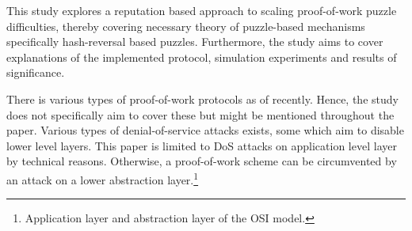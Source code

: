This study explores a reputation based approach to scaling proof-of-work puzzle difficulties, thereby covering necessary theory of puzzle-based mechanisms specifically hash-reversal based puzzles. Furthermore, the study aims to cover explanations of the implemented protocol, simulation experiments and results of significance. 

There is various types of proof-of-work protocols as of recently. Hence, the study does not specifically aim to cover these but might be mentioned throughout the paper. Various types of denial-of-service attacks exists, some which aim to disable lower level layers. This paper is limited to DoS attacks on application level layer by technical reasons. Otherwise, a proof-of-work scheme can be circumvented by an attack on a lower abstraction layer.\footnote{Application layer and abstraction layer of the OSI model.}
\begin{comment}
Scope: \\
The coverage of this study ..... \\
The study consists of ..... \\
The study covers the ..... \\
This study is focus on ..... \\

Delimitations: \\
The study does not cover the ..... \\
The researcher limited this research to ..... \\
This study is limited to ..... \\
\end{comment}